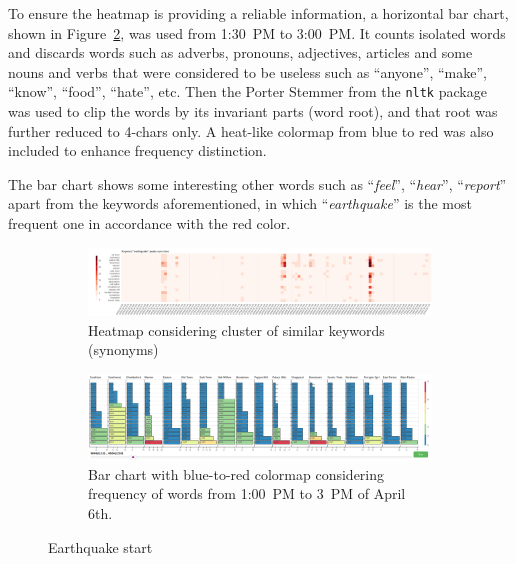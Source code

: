 To ensure the heatmap is providing a reliable information, a horizontal bar
chart, shown in Figure~\ref{fig:eq_start_hbar}, was used from 1:30~PM to 
3:00~PM. It counts isolated 
words and discards words such as adverbs, pronouns, adjectives, articles and 
some nouns and verbs that were considered to be useless such as ``anyone'',
``make'', ``know'', ``food'', ``hate'', etc. Then the Porter Stemmer from the
\texttt{nltk} package was used to clip the words by its invariant parts (word 
root), and that root was further reduced to 4-chars only. A heat-like colormap
from blue to red was also included to enhance frequency distinction. 

The bar chart shows some interesting other words such as ``\emph{feel}'',
``\emph{hear}'', ``\emph{report}'' apart from the keywords aforementioned, in
which ``\emph{earthquake}'' is the most frequent one in accordance with the red
color.

\begin{figure}[!h]
    \centering
    \begin{subfigure}[!h]{0.95\textwidth}
        \centering
        \includegraphics[width=1.00\textwidth]{figs/eq_start_heat.png}
        \caption{Heatmap considering cluster of similar keywords (synonyms)}
        \label{fig:eq_start_heat}
    \vspace{12pt}
    \end{subfigure}
    \begin{subfigure}[!h]{0.95\textwidth}
        \centering
        \includegraphics[width=1.00\textwidth]{figs/eq_start_hbar.png}
        \caption{Bar chart with blue-to-red colormap considering frequency of
        words from 1:00~PM to 3~PM of April 6th.}
        \label{fig:eq_start_hbar}
    \end{subfigure}
    \caption{Earthquake start}
    \label{fig:eq_start}
\end{figure}

